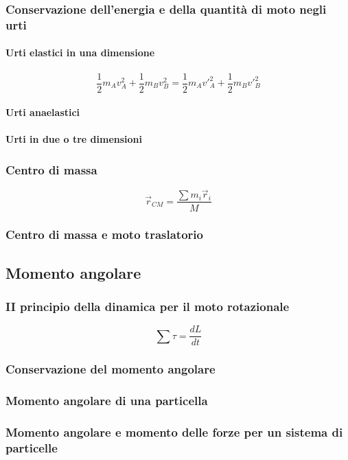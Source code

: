 \documentclass[a4paper,12pt]{article}
\theoremstyle{mystyle}
\begin{document}
\subsubsection{Conservazione dell'energia e della quantità di moto negli urti}
\paragraph{Urti elastici in una dimensione}
\[\frac{1}{2} m_Av_A^2 + \frac{1}{2} m_B v_B^2 = \frac{1}{2} m_Av'_A^2+\frac{1}{2} m_Bv'_B^2\]
\paragraph{Urti anaelastici}
\paragraph{Urti in due o tre dimensioni}
\subsubsection{Centro di massa}
\[\vec r_{CM}= \frac{\sum m_i \vec r_i}{M}\]
\subsubsection{Centro di massa e moto traslatorio}

\newpage




\subsection{Momento angolare}

\subsubsection{II principio della dinamica per il moto rotazionale}
\[\sum \tau = \frac{dL}{dt}\]

\subsubsection{Conservazione del momento angolare}
\subsubsection{Momento angolare di una particella}
\subsubsection{Momento angolare e momento delle forze per un sistema di particelle}
\end{document}
